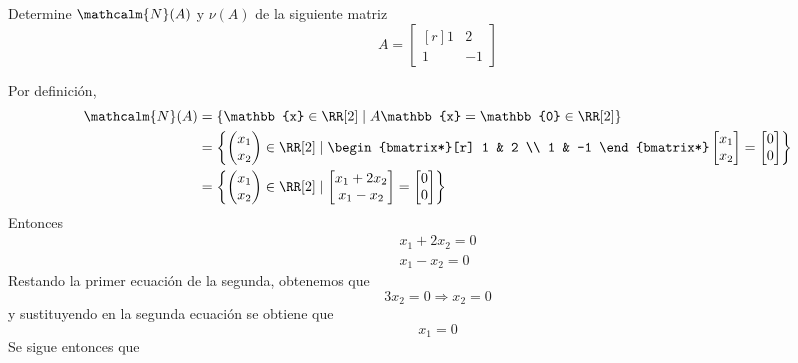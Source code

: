 \begin{examplebox}{}{}
    Determine $\mathcalm{N}(A)$ y $\nu(A)$ de la siguiente matriz
    $$A = \begin{bmatrix*}[r]
        1 & 2 \\
        1 & -1
    \end{bmatrix*}$$

    \tcblower
    \solucion Por definición,
    \begin{align*}
        \mathcalm{N}(A) & = \left\{ \mathbb{x} \in \RR[2] \mid A\mathbb{x} = \mathbb{0} \in \RR[2] \right\} \\
        & = \left\{ \begin{pmatrix}
            x_1 \\
            x_2
        \end{pmatrix} \in \RR[2] \mid \begin{bmatrix*}[r]
            1 & 2 \\
            1 & -1
        \end{bmatrix*} \begin{bmatrix}
            x_1 \\
            x_2
        \end{bmatrix} = \begin{bmatrix}
            0 \\
            0
        \end{bmatrix} \right\} \\
        & = \left\{ \begin{pmatrix}
            x_1 \\
            x_2
        \end{pmatrix} \in \RR[2] \mid \begin{bmatrix}
            x_1 + 2x_2 \\
            x_1 - x_2
        \end{bmatrix} = \begin{bmatrix}
            0 \\
            0
        \end{bmatrix} \right\}
    \end{align*}
    Entonces
    \begin{align*}
        x_1 + 2x_2 = 0\\
        x_1 - x_2 = 0
    \end{align*}
    Restando la primer ecuación de la segunda, obtenemos que
    $$3x_2 = 0 \Longrightarrow x_2 = 0$$
    y sustituyendo en la segunda ecuación se obtiene que
    $$x_1 = 0$$
    Se sigue entonces que

\end{examplebox}
